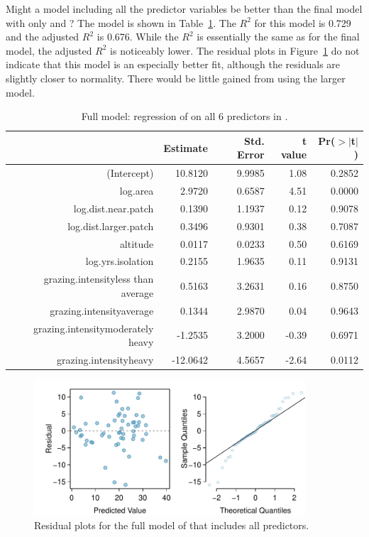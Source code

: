 Might a model including all the predictor variables be better than the final model with only  and ? The model is shown in Table~\ref{forestbirdsFullModel}. The $R^2$ for this model is 0.729 and the adjusted $R^2$ is 0.676. While the $R^2$ is essentially the same as for the final model, the adjusted $R^2$ is noticeably lower. The residual plots in Figure~\ref{forestbirdsAbunFullModelResidNormPlots} do not indicate that this model is an especially better fit, although the residuals are slightly closer to normality. There would be little gained from using the larger model.

\begin{table}[ht]
\centering
\begin{tabular}{rrrrr}
  \hline
 & Estimate & Std. Error & t value & Pr($>$$|$t$|$) \\ 
  \hline
(Intercept) & 10.8120 & 9.9985 & 1.08 & 0.2852 \\ 
  log.area & 2.9720 & 0.6587 & 4.51 & 0.0000 \\ 
  log.dist.near.patch & 0.1390 & 1.1937 & 0.12 & 0.9078 \\ 
  log.dist.larger.patch & 0.3496 & 0.9301 & 0.38 & 0.7087 \\ 
  altitude & 0.0117 & 0.0233 & 0.50 & 0.6169 \\ 
  log.yrs.isolation & 0.2155 & 1.9635 & 0.11 & 0.9131 \\ 
  grazing.intensityless than average & 0.5163 & 3.2631 & 0.16 & 0.8750 \\ 
  grazing.intensityaverage & 0.1344 & 2.9870 & 0.04 & 0.9643 \\ 
  grazing.intensitymoderately heavy & -1.2535 & 3.2000 & -0.39 & 0.6971 \\ 
  grazing.intensityheavy & -12.0642 & 4.5657 & -2.64 & 0.0112 \\ 
   \hline
\end{tabular}

\caption{Full model: regression of  on all 6 predictors in .}
\label{forestbirdsFullModel}
\end{table}

\begin{figure}[h!]
 	\centering
 	\includegraphics[width=0.9\textwidth]
{ch_multiple_linear_regression_oi_biostat/figures/forestbirdsAbunFullModelResidNormPlots/forestbirdsAbunFullModelResidNormPlots.pdf}
     \caption{Residual plots for the full model of  that includes all predictors.}
    	\label{forestbirdsAbunFullModelResidNormPlots}
 \end{figure}

